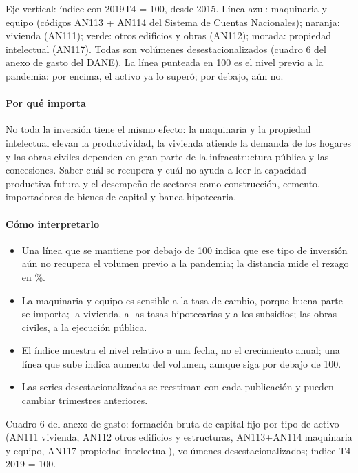 \begin{leer}
Eje vertical: índice con 2019T4 = 100, desde 2015. Línea azul: maquinaria y equipo (códigos AN113 + AN114 del Sistema de Cuentas Nacionales); naranja: vivienda (AN111); verde: otros edificios y obras (AN112); morada: propiedad intelectual (AN117). Todas son volúmenes desestacionalizados (cuadro 6 del anexo de gasto del DANE). La línea punteada en 100 es el nivel previo a la pandemia: por encima, el activo ya lo superó; por debajo, aún no.
\end{leer}

\paragraph{Por qué importa}
No toda la inversión tiene el mismo efecto: la maquinaria y la propiedad intelectual elevan la productividad, la vivienda atiende la demanda de los hogares y las obras civiles dependen en gran parte de la infraestructura pública y las concesiones. Saber cuál se recupera y cuál no ayuda a leer la capacidad productiva futura y el desempeño de sectores como construcción, cemento, importadores de bienes de capital y banca hipotecaria.

\paragraph{Cómo interpretarlo}
\begin{itemize}
\item Una línea que se mantiene por debajo de 100 indica que ese tipo de inversión aún no recupera el volumen previo a la pandemia; la distancia mide el rezago en \%.
\item La maquinaria y equipo es sensible a la tasa de cambio, porque buena parte se importa; la vivienda, a las tasas hipotecarias y a los subsidios; las obras civiles, a la ejecución pública.
\item El índice muestra el nivel relativo a una fecha, no el crecimiento anual; una línea que sube indica aumento del volumen, aunque siga por debajo de 100.
\item Las series desestacionalizadas se reestiman con cada publicación y pueden cambiar trimestres anteriores.
\end{itemize}
\begin{formulas}[Fórmulas]
\end{formulas}
\begin{metodo}[Metodología]
Cuadro 6 del anexo de gasto: formación bruta de capital fijo por tipo de activo (AN111 vivienda, AN112 otros edificios y estructuras, AN113+AN114 maquinaria y equipo, AN117 propiedad intelectual), volúmenes desestacionalizados; índice T4 2019 = 100.
\par{}
\end{metodo}

